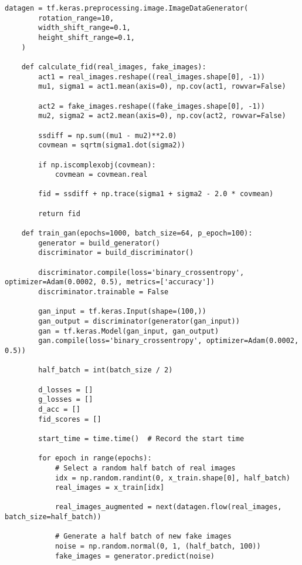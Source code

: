 \begin{lstlisting}[style=mypython, caption=Explore data augmentation 2]
    datagen = tf.keras.preprocessing.image.ImageDataGenerator(
        rotation_range=10,
        width_shift_range=0.1,
        height_shift_range=0.1,
    )
    
    def calculate_fid(real_images, fake_images):
        act1 = real_images.reshape((real_images.shape[0], -1))
        mu1, sigma1 = act1.mean(axis=0), np.cov(act1, rowvar=False)
        
        act2 = fake_images.reshape((fake_images.shape[0], -1))
        mu2, sigma2 = act2.mean(axis=0), np.cov(act2, rowvar=False)
        
        ssdiff = np.sum((mu1 - mu2)**2.0)
        covmean = sqrtm(sigma1.dot(sigma2))
        
        if np.iscomplexobj(covmean):
            covmean = covmean.real
        
        fid = ssdiff + np.trace(sigma1 + sigma2 - 2.0 * covmean)
        
        return fid
    
    def train_gan(epochs=1000, batch_size=64, p_epoch=100):
        generator = build_generator()
        discriminator = build_discriminator()
    
        discriminator.compile(loss='binary_crossentropy', optimizer=Adam(0.0002, 0.5), metrics=['accuracy'])
        discriminator.trainable = False
    
        gan_input = tf.keras.Input(shape=(100,))
        gan_output = discriminator(generator(gan_input))
        gan = tf.keras.Model(gan_input, gan_output)
        gan.compile(loss='binary_crossentropy', optimizer=Adam(0.0002, 0.5))
    
        half_batch = int(batch_size / 2)
        
        d_losses = []
        g_losses = []
        d_acc = []
        fid_scores = []
        
        start_time = time.time()  # Record the start time
    
        for epoch in range(epochs):
            # Select a random half batch of real images
            idx = np.random.randint(0, x_train.shape[0], half_batch)
            real_images = x_train[idx]
    
            real_images_augmented = next(datagen.flow(real_images, batch_size=half_batch))
    
            # Generate a half batch of new fake images
            noise = np.random.normal(0, 1, (half_batch, 100))
            fake_images = generator.predict(noise)
    

\end{lstlisting}
